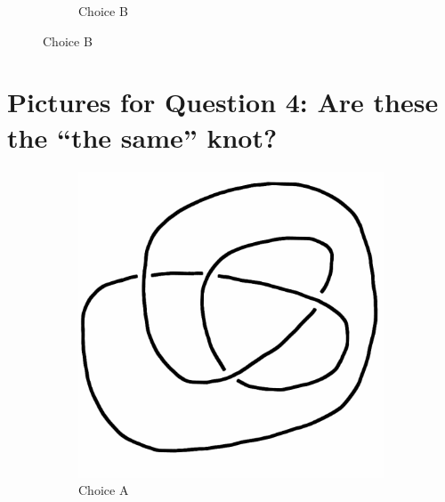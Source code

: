 \documentclass[12pt,letterpaper]{article}
\theoremstyle{definition}
\begin{document}
\begin{figure}[h!]
\begin{subfigure}[b]{0.4\textwidth}
        \caption{Choice B}
    \end{subfigure}
\end{figure}

\section*{Pictures for Question 4: Are these the ``the same'' knot?}

\begin{figure}[h!]
    \begin{subfigure}[b]{0.4\textwidth}
        \includegraphics[width=\textwidth]{knotpics/9SeptQ4a.png}
        \caption{Choice A}
    \end{subfigure}
    \hspace{2cm}
    \begin{subfigure}[b]{0.4\textwidth}

\end{subfigure}
\end{figure}
\end{document}
